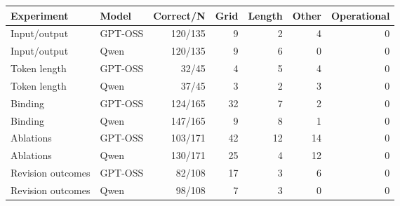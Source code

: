 \begin{tabular}{llrrrrr}
\toprule
Experiment & Model & Correct/N & Grid & Length & Other & Operational\\
\midrule
Input/output & GPT-OSS & 120/135 & 9 & 2 & 4 & 0\\
Input/output & Qwen & 120/135 & 9 & 6 & 0 & 0\\
Token length & GPT-OSS & 32/45 & 4 & 5 & 4 & 0\\
Token length & Qwen & 37/45 & 3 & 2 & 3 & 0\\
Binding & GPT-OSS & 124/165 & 32 & 7 & 2 & 0\\
Binding & Qwen & 147/165 & 9 & 8 & 1 & 0\\
Ablations & GPT-OSS & 103/171 & 42 & 12 & 14 & 0\\
Ablations & Qwen & 130/171 & 25 & 4 & 12 & 0\\
Revision outcomes & GPT-OSS & 82/108 & 17 & 3 & 6 & 0\\
Revision outcomes & Qwen & 98/108 & 7 & 3 & 0 & 0\\
\bottomrule
\end{tabular}
